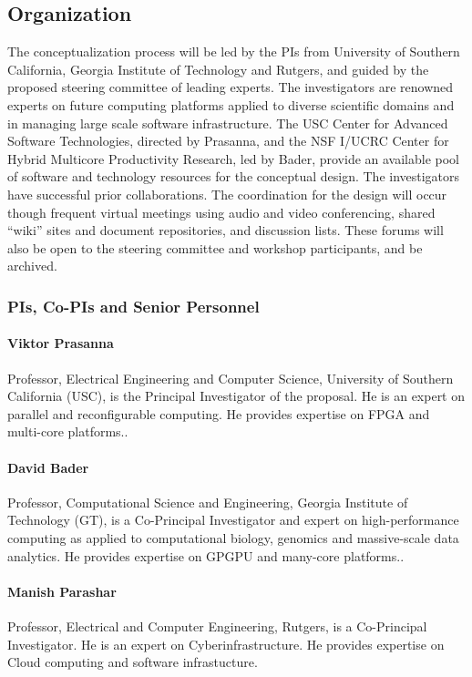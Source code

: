 \subsection{Organization}
The conceptualization process will be led by the PIs from University of Southern California,
Georgia Institute of Technology and Rutgers, and guided by the proposed steering committee of
leading experts. The investigators are renowned experts on future computing platforms applied to
diverse scientific domains and in managing large scale software infrastructure. The USC Center for
Advanced Software Technologies, directed by Prasanna, and the NSF I/UCRC Center for Hybrid
Multicore Productivity Research, led by Bader, provide an available pool of software and technology
resources for the conceptual design. The investigators have successful prior collaborations. The
coordination for the design will occur though frequent virtual meetings using audio and video
conferencing, shared “wiki” sites and document repositories, and discussion lists. These forums
will also be open to the steering committee and workshop participants, and be archived.

\subsubsection{PIs, Co-PIs and Senior Personnel}

\paragraph{Viktor Prasanna} Professor, Electrical Engineering and Computer Science, University of Southern
California (USC), is the Principal Investigator of the proposal. He is an expert on parallel and
reconfigurable computing. He provides expertise on FPGA and multi-core platforms..

\paragraph{David Bader} Professor, Computational Science and Engineering, Georgia Institute of Technology
(GT), is a Co-Principal Investigator and expert on high-performance computing as applied to
computational biology, genomics and massive-scale data analytics. He provides expertise on
GPGPU and many-core platforms..

\paragraph{Manish Parashar} Professor, Electrical and Computer Engineering, Rutgers, is a Co-Principal Investigator.
He is an expert on Cyberinfrastructure. He provides expertise on Cloud computing
and software infrastucture.

